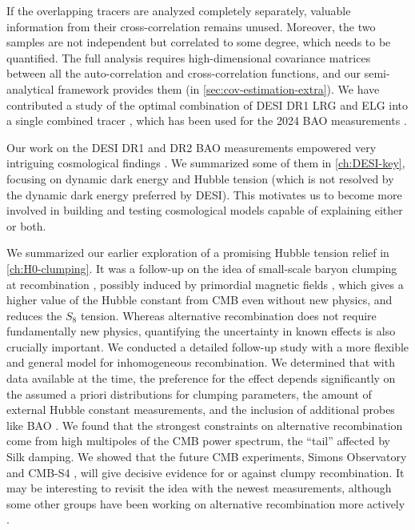 If the overlapping tracers are analyzed completely separately, valuable information from their cross-correlation remains unused.
Moreover, the two samples are not independent but correlated to some degree, which needs to be quantified.
The full analysis requires high-dimensional covariance matrices between all the auto-correlation and cross-correlation functions, and our semi-analytical framework provides them (in \cref{sec:cov-estimation-extra}).
We have contributed a study of the optimal combination of DESI DR1 LRG and ELG into a single combined tracer \citep{KP4s5-Valcin}, which has been used for the 2024 BAO measurements \citep{DESI2024.III.KP4}.

Our work on the DESI DR1 and DR2 BAO measurements empowered very intriguing cosmological findings \citep{DESI2024.VI.KP7A,DESI.DR2.BAO.cosmo}.
We summarized some of them in \cref{ch:DESI-key}, focusing on dynamic dark energy and Hubble tension (which is not resolved by the dynamic dark energy preferred by DESI).
This motivates us to become more involved in building and testing cosmological models capable of explaining either or both.

We summarized our earlier exploration of a promising Hubble tension relief in \cref{ch:H0-clumping}.
It was a follow-up on the idea of small-scale baryon clumping at recombination \citep{JP20}, possibly induced by primordial magnetic fields \citep{PMF11,PMF13,PMF19}, which gives a higher value of the Hubble constant from CMB even without new physics, and reduces the $S_8$ tension.
Whereas alternative recombination does not require fundamentally new physics, quantifying the uncertainty in known effects is also crucially important.
We conducted a detailed follow-up study with a more flexible and general model for inhomogeneous recombination.
We determined that with data available at the time, the preference for the effect depends significantly on the assumed a priori distributions for clumping parameters, the amount of external Hubble constant measurements, and the inclusion of additional probes like BAO \citep[a conclusion similar to][]{sound-horizon-not-enough}.
We found that the strongest constraints on alternative recombination come from high multipoles of the CMB power spectrum, the ``tail'' affected by Silk damping.
We showed that the future CMB experiments, Simons Observatory \citep{SO} and CMB-S4 \citep{CMBS4,CMBS4white}, will give decisive evidence for or against clumpy recombination.
It may be interesting to revisit the idea with the newest measurements, although some other groups have been working on alternative recombination more actively \citep[e.g.,][]{recombination-reconstruction-Lynch}.

